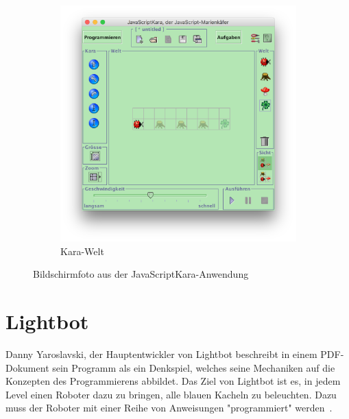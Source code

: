 \begin{figure}
\begin{subfigure}[b]{0.5\textwidth}
        \includegraphics[width=\textwidth]{gfx/related-kara-world.png}
        \caption{Kara-Welt}
        \label{fig:related:kara:world}
    \end{subfigure}
    \caption{Bildschirmfoto aus der JavaScriptKara-Anwendung}
    \label{fig:related:kara}
\end{figure}

\section{Lightbot}
\label{sec:related:lightbot}

Danny Yaroslavski, der Hauptentwickler von Lightbot beschreibt in einem PDF-Dokument sein Programm als ein Denkspiel, welches seine Mechaniken auf die Konzepten des Programmierens abbildet. Das Ziel von Lightbot ist es, in jedem Level einen Roboter dazu zu bringen, alle blauen Kacheln zu beleuchten. Dazu muss der Roboter mit einer Reihe von Anweisungen "programmiert" werden~\cite{yaroslavski2014}.

